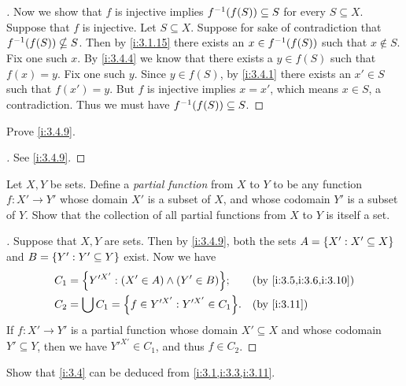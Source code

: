 \begin{proof}[]
  Now we show that \(f\) is injective implies \(f^{-1}\pa{f(S)} \subseteq S\) for every \(S \subseteq X\).
  Suppose that \(f\) is injective.
  Let \(S \subseteq X\).
  Suppose for sake of contradiction that \(f^{-1}\pa{f(S)} \nsubseteq S\).
  Then by \cref{i:3.1.15} there exists an \(x \in f^{-1}\pa{f(S)}\) such that \(x \notin S\).
  Fix one such \(x\).
  By \cref{i:3.4.4} we know that there exists a \(y \in f(S)\) such that \(f(x) = y\).
  Fix one such \(y\).
  Since \(y \in f(S)\), by \cref{i:3.4.1} there exists an \(x' \in S\) such that \(f(x') = y\).
  But \(f\) is injective implies \(x = x'\), which means \(x \in S\), a contradiction.
  Thus we must have \(f^{-1}\pa{f(S)} \subseteq S\).
\end{proof}

\begin{ex}\label{i:ex:3.4.6}
  Prove \cref{i:3.4.9}.
\end{ex}

\begin{proof}[]
  See \cref{i:3.4.9}.
\end{proof}

\begin{ex}\label{i:ex:3.4.7}
  Let \(X, Y\) be sets.
  Define a \emph{partial function} from \(X\) to \(Y\) to be any function \(f : X' \to Y'\) whose domain \(X'\) is a subset of \(X\), and whose codomain \(Y'\) is a subset of \(Y\).
  Show that the collection of all partial functions from \(X\) to \(Y\) is itself a set.
\end{ex}

\begin{proof}[]
  Suppose that \(X, Y\) are sets.
  Then by \cref{i:3.4.9}, both the sets \(A = \left\lbrace X' : X' \subseteq X\right\rbrace\) and \(B = \left\lbrace Y' : Y' \subseteq Y\right\rbrace\) exist.
  Now we have
  \begin{align*}
    C_1 & = \set{Y'^{X'} : \pa{X' \in A} \land \pa{Y' \in B}};   &  & \by{i:3.5,i:3.6,i:3.10} \\
    C_2 & = \bigcup C_1 = \set{f \in Y'^{X'} : Y'^{X'} \in C_1}. &  & \by{i:3.11}             \\
  \end{align*}
  If \(f : X' \to Y'\) is a partial function whose domain \(X' \subseteq X\) and whose codomain \(Y' \subseteq Y\), then we have \(Y'^{X'} \in C_1\), and thus \(f \in C_2\).
\end{proof}

\begin{ex}\label{i:ex:3.4.8}
  Show that \cref{i:3.4} can be deduced from \cref{i:3.1,i:3.3,i:3.11}.
\end{ex}

